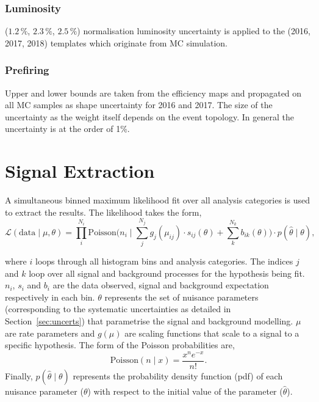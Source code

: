\subsubsection{Luminosity}
($1.2\,\%$, $2.3\,\%$, $2.5\,\%$) normalisation luminosity uncertainty is applied to the (2016, 2017, 2018) templates which originate from MC simulation.

\subsubsection{Prefiring}
Upper and lower bounds are taken from the efficiency maps and propagated on all MC samples as shape uncertainty for 2016 and 2017.
The size of the uncertainty as the weight itself depends on the event topology. In general the uncertainty is at the order of 1\%.

\section{Signal Extraction}
\label{sec:sig_ext}

A simultaneous binned maximum likelihood fit over all analysis categories is used to extract the results.
The likelihood takes the form,
\begin{equation}
\mathcal{L}(\text{data}\mid\mu,\theta) = \prod_{i}^{N_{i}} \text{Poisson} \Big(n_{i} \mid \sum_{j}^{N_{j}} g_{j}(\mu_{ij}) \cdot s_{ij}(\theta) + \sum_{k}^{N_{k}} b_{ik}(\theta)\Big) \cdot p(\hat{\theta} \mid \theta),
\label{eqn:likelihood}
\end{equation}

where $i$ loops through all histogram bins and analysis categories.
The indices $j$ and $k$ loop over all signal and background processes for the hypothesis being fit.
$n_i$, $s_i$ and $b_i$ are the data observed, signal and background expectation respectively in each bin.
$\theta$ represents the set of nuisance parameters (corresponding to the systematic uncertainties as detailed in Section~\ref{sec:uncerts}) that parametrise the signal and background modelling.
$\mu$ are rate parameters and $g(\mu)$ are scaling functions that scale to a signal to a specific hypothesis.
The form of the Poisson probabilities are,
\begin{equation}
\text{Poisson} (n \mid x) = \frac{x^{n}e^{-x}}{n!}.
\end{equation}
Finally, $p(\hat{\theta} \mid \theta)$ represents the probability density function (pdf) of each nuisance parameter ($\theta$) with respect to the initial value of the parameter ($\hat{\theta}$). \\

